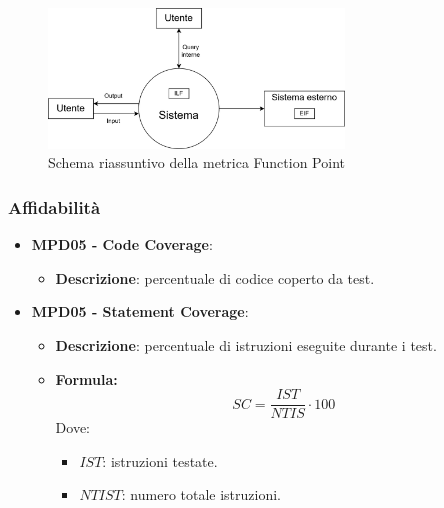 \documentclass[10pt]{article}
\begin{document}
\begin{justify}
\begin{itemize}
\begin{itemize}
                        \begin{figure}[H]
                        \centering
                        \includegraphics[width=0.7\textwidth]{FunctionPointFigure.png}
                        \caption{Schema riassuntivo della metrica Function Point}
                        \end{figure}

            \end{itemize}
\end{itemize}

\subsubsection{Affidabilità}
\begin{itemize}
    \item \textbf{MPD05 - Code Coverage}:
    \begin{itemize}
        \item \textbf{Descrizione}: percentuale di codice coperto da test.
    \end{itemize}
    \item \textbf{MPD05 - Statement Coverage}:
    \begin{itemize}
        \item   \textbf{Descrizione}: percentuale di istruzioni eseguite durante i test.
        \item   \textbf{Formula:}
                \[
                SC = \frac{IST}{NTIS} \cdot 100
                \]
                Dove:
                \begin{itemize}
                    \item $IST$: istruzioni testate.
                    \item $NTIST$: numero totale istruzioni.
                \end{itemize}
    \end{itemize}


\end{itemize}
\end{justify}
\end{document}
